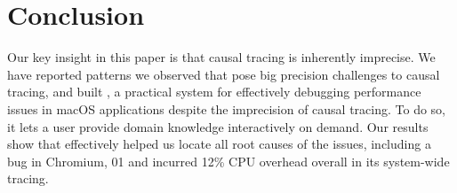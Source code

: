 \section{Conclusion} \label{sec:conclusion}
Our key insight in this paper is that causal tracing is inherently
imprecise. We have reported patterns we observed that pose big precision
challenges to causal tracing, and built \xxx, a practical system for
effectively debugging performance issues in macOS applications despite the
imprecision of causal tracing.  To do so, it lets a user provide domain
knowledge interactively on demand. Our results show that \xxx effectively
helped us locate all root causes of the issues, including a bug in Chromium,
01 and incurred 12\% CPU overhead overall in its system-wide tracing.